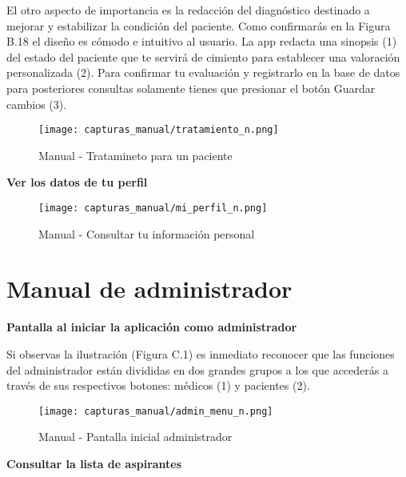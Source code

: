 \documentclass[11pt,spanish,
		listoftables,listoffigures]
		{tfgplantilla}
\begin{document}
El otro aspecto de importancia es la redacción del diagnóstico destinado a mejorar y estabilizar la condición del paciente. Como confirmarás en la Figura B.18 el diseño es cómodo e intuitivo al usuario. La app redacta una sinopsis (1) del estado del paciente que te servirá de cimiento para establecer una valoración personalizada (2). Para confirmar tu evaluación y registrarlo en la base de datos para posteriores consultas solamente tienes que presionar el botón \textquotedbl Guardar cambios\textquotedbl{} (3).

\begin{figure}[H]
\centering
\texttt{[image: capturas\_manual/tratamiento\_n.png]}
\caption{Manual - Tratamineto para un paciente}
\end{figure}

\textbf {Ver los datos de tu perfil}


\begin{figure}[H]
\centering
\texttt{[image: capturas\_manual/mi\_perfil\_n.png]}
\caption{Manual - Consultar tu información personal}
\end{figure}

\section{Manual de administrador}


\textbf {Pantalla al iniciar la aplicación como administrador}

Si observas la ilustración (Figura C.1) es inmediato reconocer que las funciones del administrador están divididas en dos grandes grupos a los que accederás a través de sus respectivos botones: médicos (1) y pacientes (2).

\begin{figure}[H]
\centering
\texttt{[image: capturas\_manual/admin\_menu\_n.png]}
\caption{Manual - Pantalla inicial administrador}
\end{figure}

\textbf {Consultar la lista de aspirantes}
\end{document}
